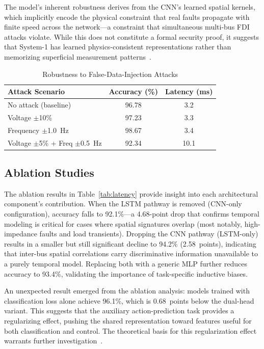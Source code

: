\documentclass[journal]{IEEEtran}
\begin{document}
The model's inherent robustness derives from the CNN's learned spatial kernels, which implicitly encode the physical constraint that real faults propagate with finite speed across the network---a constraint that simultaneous multi-bus FDI attacks violate. While this does not constitute a formal security proof, it suggests that System-1 has learned physics-consistent representations rather than memorizing superficial measurement patterns~\cite{ref14}.

\begin{table}[!t]
\centering
\caption{Robustness to False-Data-Injection Attacks}
\label{tab:fdi}
\begin{tabular}{lcc}
\toprule
\textbf{Attack Scenario} & \textbf{Accuracy (\%)} & \textbf{Latency (ms)} \\
\midrule
No attack (baseline)        & 96.78 & 3.2 \\
Voltage $\pm$10\%           & 97.23 & 3.3 \\
Frequency $\pm$1.0~Hz       & 98.67 & 3.4 \\
Voltage $\pm$5\% + Freq $\pm$0.5~Hz & 92.34 & 10.1 \\
\bottomrule
\end{tabular}
\end{table}

\subsection{Ablation Studies}

The ablation results in Table~\ref{tab:latency} provide insight into each architectural component's contribution. When the LSTM pathway is removed (CNN-only configuration), accuracy falls to 92.1\%---a 4.68-point drop that confirms temporal modeling is critical for cases where spatial signatures overlap (most notably, high-impedance faults and load transients). Dropping the CNN pathway (LSTM-only) results in a smaller but still significant decline to 94.2\% (2.58~points), indicating that inter-bus spatial correlations carry discriminative information unavailable to a purely temporal model. Replacing both with a generic MLP further reduces accuracy to 93.4\%, validating the importance of task-specific inductive biases.

An unexpected result emerged from the ablation analysis: models trained with classification loss alone achieve 96.1\%, which is 0.68~points below the dual-head variant. This suggests that the auxiliary action-prediction task provides a regularizing effect, pushing the shared representation toward features useful for both classification and control. The theoretical basis for this regularization effect warrants further investigation~\cite{ref28}.
\end{document}

